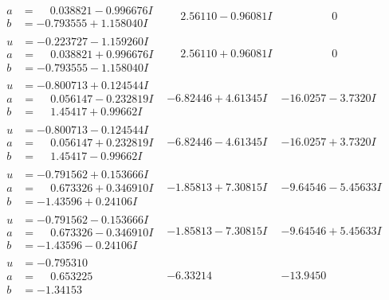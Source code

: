 \documentclass[1p]{elsarticle_modified}
\theoremstyle{definition}
\begin{document}
$$\begin{array}{c|c|c}
\begin{aligned}
a &= \phantom{-}0.038821 - 0.996676 I \\
b &= -0.793555 + 1.158040 I\end{aligned}
 & \phantom{-}2.56110 - 0.96081 I & \phantom{-0.000000 } 0 \\ \hline\begin{aligned}
u &= -0.223727 - 1.159260 I \\
a &= \phantom{-}0.038821 + 0.996676 I \\
b &= -0.793555 - 1.158040 I\end{aligned}
 & \phantom{-}2.56110 + 0.96081 I & \phantom{-0.000000 } 0 \\ \hline\begin{aligned}
u &= -0.800713 + 0.124544 I \\
a &= \phantom{-}0.056147 - 0.232819 I \\
b &= \phantom{-}1.45417 + 0.99662 I\end{aligned}
 & -6.82446 + 4.61345 I & -16.0257 - 3.7320 I \\ \hline\begin{aligned}
u &= -0.800713 - 0.124544 I \\
a &= \phantom{-}0.056147 + 0.232819 I \\
b &= \phantom{-}1.45417 - 0.99662 I\end{aligned}
 & -6.82446 - 4.61345 I & -16.0257 + 3.7320 I \\ \hline\begin{aligned}
u &= -0.791562 + 0.153666 I \\
a &= \phantom{-}0.673326 + 0.346910 I \\
b &= -1.43596 + 0.24106 I\end{aligned}
 & -1.85813 + 7.30815 I & -9.64546 - 5.45633 I \\ \hline\begin{aligned}
u &= -0.791562 - 0.153666 I \\
a &= \phantom{-}0.673326 - 0.346910 I \\
b &= -1.43596 - 0.24106 I\end{aligned}
 & -1.85813 - 7.30815 I & -9.64546 + 5.45633 I \\ \hline\begin{aligned}
u &= -0.795310\phantom{ +0.000000I} \\
a &= \phantom{-}0.653225\phantom{ +0.000000I} \\
b &= -1.34153\phantom{ +0.000000I}\end{aligned}
 & -6.33214\phantom{ +0.000000I} & -13.9450\phantom{ +0.000000I} \\ \hline\begin{aligned}

\end{aligned}
\end{array}$$
\end{document}
